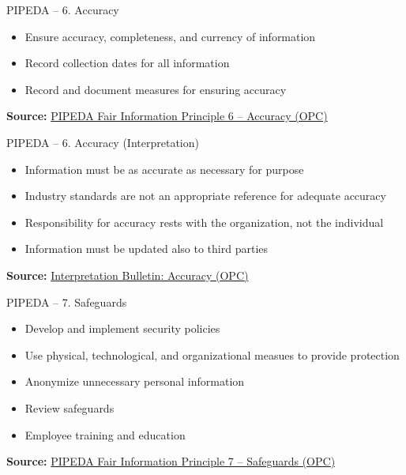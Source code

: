 \documentclass[ignorenonframetext,xcolor=x11names]{beamer}
\begin{document}
\begin{frame}{PIPEDA -- 6. Accuracy}
\begin{itemize}
   \item Ensure accuracy, completeness, and currency of information
   \item Record collection dates for all information
   \item Record and document measures for ensuring accuracy
\end{itemize}

\vspace{\baselineskip}
\scriptsize \textbf{Source:} \href{https://www.priv.gc.ca/en/privacy-topics/privacy-laws-in-canada/the-personal-information-protection-and-electronic-documents-act-pipeda/p_principle/principles/p_accuracy/}{PIPEDA Fair Information Principle 6 -- Accuracy (OPC)} 
\end{frame}

\begin{frame}{PIPEDA -- 6. Accuracy \small (Interpretation)}
\begin{itemize}
   \item Information must be as accurate as necessary for purpose
   \item Industry standards are not an appropriate reference for adequate accuracy
   \item Responsibility for accuracy rests with the organization, not the individual
   \item Information must be updated also to third parties
\end{itemize}

\vspace{\baselineskip}
\scriptsize \textbf{Source:} \href{https://www.priv.gc.ca/en/privacy-topics/privacy-laws-in-canada/the-personal-information-protection-and-electronic-documents-act-pipeda/pipeda-compliance-help/pipeda-interpretation-bulletins/interpretations_04_accuracy/}{Interpretation Bulletin: Accuracy (OPC)}
\end{frame}

\begin{frame}{PIPEDA -- 7. Safeguards}
\begin{itemize}
   \item Develop and implement security policies
   \item Use physical, technological, and organizational measues to provide protection
   \item Anonymize unnecessary personal information
   \item Review safeguards
   \item Employee training and education
\end{itemize}

\vspace{\baselineskip}
\scriptsize \textbf{Source:} \href{https://www.priv.gc.ca/en/privacy-topics/privacy-laws-in-canada/the-personal-information-protection-and-electronic-documents-act-pipeda/p_principle/principles/p_safeguards/}{PIPEDA Fair Information Principle 7 -- Safeguards (OPC)}
\end{frame}
\end{document}
